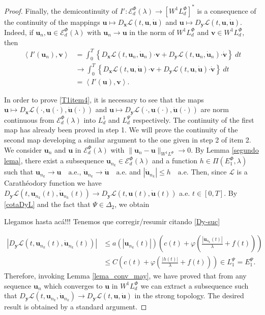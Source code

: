 \documentclass[twoside]{article}
\theoremstyle{remark}
\newcommand{\lphi}{L^{\Phi}}
\newcommand{\lpsi}{L^{\Psi}}
\newcommand{\ephi}{E^{\Phi}}
\newcommand{\wphi}{W^{1}\lphi}
\newcommand{\sobnor}{\|_{W^{1}\lphi}}
\newcommand{\domi}{\mathcal{E}^{\Phi}_d(\lambda)}
\renewcommand{\b}[1]{\boldsymbol{#1}}
\newcommand{\ccdot}{\b{\cdot}}
\renewcommand{\leq}{\leqslant}
\newcommand{\epsi}{E^{\Psi}}
\begin{document}
\begin{proof}
Finally, the demicontinuity of $I':\domi  \to \left[\wphi_d
\right]^* $ is a consequence of the continuity of the mappings $\b{u} \mapsto D_{\b{x}}\mathcal{L}(t,\b{u},\b{\dot{u}})$ and $\b{u} \mapsto
D_{\b{y}}\mathcal{L}(t,\b{u},\b{\dot{u}})$. Indeed, if $\b{u}_n,\b{u}\in \domi$ with $\b{u}_n\to \b{u}$ in the norm of $\wphi_d$ and $\b{v} \in
\wphi_d$, then
\[
\begin{split}
\left\langle  I'(\b{u}_{n}),\b{v} \right\rangle &= \int_0^T \left\{  D_{\b{x}}\mathcal{L}\left(t,\b{u}_n,\b{\dot{u}}_n\right)\ccdot
\b{v} +
 D_{\b{y}}\mathcal{L}\left(t,\b{u}_n,\b{\dot{u}}_n\right)\ccdot\b{\dot{v}}\right\} \ dt\\
&\rightarrow \int_0^T \left\{ D_{\b{x}}\mathcal{L}\left(t,\b{u},\b{\dot{u}}\right)\ccdot \b{v}+ 
D_{\b{y}}\mathcal{L}\left(t,\b{u},\b{\dot{u}}\right)\ccdot\b{\dot{v}}\right\} \ dt\\
&=\left\langle  I'(\b{u}),\b{v} \right\rangle.
\end{split}
\]


In order to prove  \ref{T1item4}, it is necessary to see that the maps $\b{u}\mapsto D_{\b{x}}\mathcal{L}(\cdot,\b{u}(\cdot),\b{\dot{u}}(\cdot))$  and $\b{u}\mapsto D_{\b{y}}\mathcal{L}(\cdot,\b{u}(\cdot),\b{\dot{u}}(\cdot))$  are norm continuous
from $\domi $ into $L^1_d$ and
 $\lpsi_d$ respectively.  The continuity of the first map has already been proved in step 1. 
We will prove the continuity of the second map developing a similar argument to the one given in step 2 of item 2.  
We consider $\b{u}_n$ and $\b{u}$ in $\domi$ with $\|\b{u}_n- \b{u}\sobnor\to 0$.
By Lemma \ref{segundo lema}, there exist a subsequence $\b{u}_{n_k}\in \domi$ and a function $h\in\Pi(\ephi_1,\lambda)$ such that $\b{u}_{n_k}\rightarrow \b{u} \quad\text{a.e.}$, $\b{\dot{u}}_{n_k}\rightarrow \b{\dot{u}} \quad\text{a.e.}$ and $|\b{\dot{u}}_{n_k}|\leq h\quad\text{a.e.}$ Then,  since $\mathcal{L}$ is a Carath\'eodory function
 we have $ D_{\b{y}}\mathcal{L}(t,\b{u}_{n_k}(t),\b{\dot{u}}_{n_k}(t))\to D_{\b{y}}\mathcal{L}(t,\b{u}(t),\b{\dot{u}}(t))$ a.e. $t\in [0,T]$. By \eqref{cotaDyL} and the fact that $\Psi\in \Delta_2$, we obtain

{\color{red} Llegamos hasta ac\'a!!! Tenemos que corregir/resumir  citando \eqref{Dy-suc}}

 \[\begin{split}
    |D_{\b{y}}\mathcal{L}(t,\b{u}_{n_k}(t),\b{\dot{u}}_{n_k}(t))| &\leq a(|\b{u}_{n_k}(t)|)\left( c(t) + \varphi \left(\frac{|\b{\dot{u}}_{n_k}(t)|}{\lambda}+f(t)\right)\right)\\
    &\leq C\left( c(t) + \varphi \left(\frac{|h(t)|}{\lambda}+f(t)\right)\right)\in \lpsi_1=\epsi_1.
   \end{split}
\]
Therefore, invoking  Lemma \ref{lema_conv_may}, we have proved that
  from any sequence $\b{u}_n$ which converges to $\b{u}$ in $\wphi_d$ we can
extract a subsequence such that  \linebreak $D_{\b{y}}\mathcal{L}(t,\b{u}_{n_k},\b{\dot{u}}_{n_k})\to D_{\b{y}}\mathcal{L}(t,\b{u},\b{\dot{u}})$ in the strong topology. The desired result is obtained by a standard argument.


\end{proof}
\end{document}
